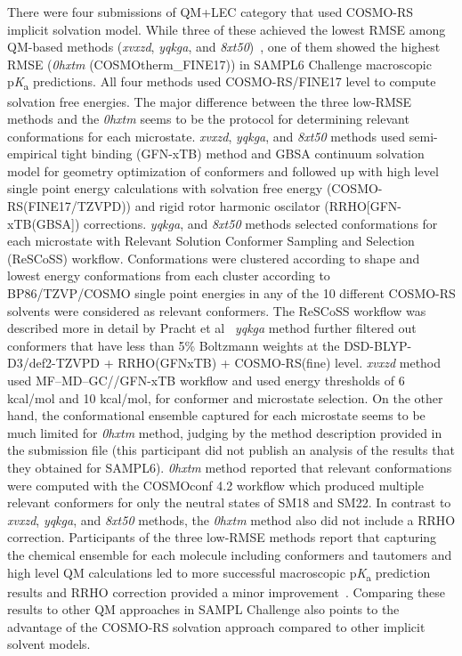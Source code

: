 \documentclass[9pt,lineno,final]{elife}
\newcommand{\pKa}{p\textit{K}\textsubscript{a}}
\begin{document}
There were four submissions of QM+LEC category that used COSMO-RS implicit solvation model. 
While three of these achieved the lowest RMSE among QM-based methods (\textit{xvxzd}, \textit{yqkga}, and \textit{8xt50})~\citep{Pracht:2018:J.Comput.AidedMol.Des.}, one of them showed the highest RMSE (\textit{0hxtm} (COSMOtherm\_FINE17)) in SAMPL6 Challenge macroscopic \pKa{} predictions. 
All four methods used COSMO-RS/FINE17 level to compute solvation free energies. The major difference between the three low-RMSE methods and the \textit{0hxtm} seems to be the protocol for determining relevant conformations for each microstate. 
\textit{xvxzd}, \textit{yqkga}, and \textit{8xt50} methods used semi-empirical tight binding (GFN-xTB) method and GBSA continuum solvation model for geometry optimization of conformers and followed up with high level single point energy calculations with solvation free energy (COSMO-RS(FINE17/TZVPD)) and rigid rotor harmonic oscilator (RRHO[GFN-xTB(GBSA]) corrections. 
\textit{yqkga}, and \textit{8xt50} methods selected  conformations for each microstate with Relevant Solution Conformer Sampling and Selection (ReSCoSS) workflow. Conformations were clustered according to shape and lowest energy conformations from each cluster according to BP86/TZVP/COSMO single point energies in any of the 10 different COSMO-RS solvents were considered as relevant conformers. The ReSCoSS workflow was described more in detail by Pracht et al~\citep{Pracht:2018:J.Comput.AidedMol.Des.}
\textit{yqkga} method further filtered out conformers that have less than 5\% Boltzmann weights at the DSD-BLYP-D3/def2-TZVPD + RRHO(GFNxTB) + COSMO-RS(fine) level.
\textit{xvxzd} method used MF–MD–GC//GFN-xTB workflow and used energy thresholds of 6 kcal/mol and 10 kcal/mol, for conformer and microstate selection.
On the other hand, the conformational ensemble captured for each microstate seems to be much limited for \textit{0hxtm} method, judging by the method description provided in the submission file (this participant did not publish an analysis of the results that they obtained for SAMPL6). \textit{0hxtm} method reported that relevant conformations were computed with the COSMOconf 4.2 workflow which produced multiple relevant conformers for only the neutral states of SM18 and SM22.  
In contrast to \textit{xvxzd}, \textit{yqkga}, and \textit{8xt50} methods, the \textit{0hxtm} method also did not include a RRHO correction.
Participants of the three low-RMSE methods report that capturing the chemical ensemble for each molecule including conformers and tautomers and high level QM calculations led to more successful macroscopic \pKa{} prediction results and RRHO correction provided a minor improvement~\citep{Pracht:2018:J.Comput.AidedMol.Des.}. Comparing these results to other QM approaches in SAMPL Challenge also points to the advantage of the COSMO-RS solvation approach compared to other implicit solvent models.
\end{document}
